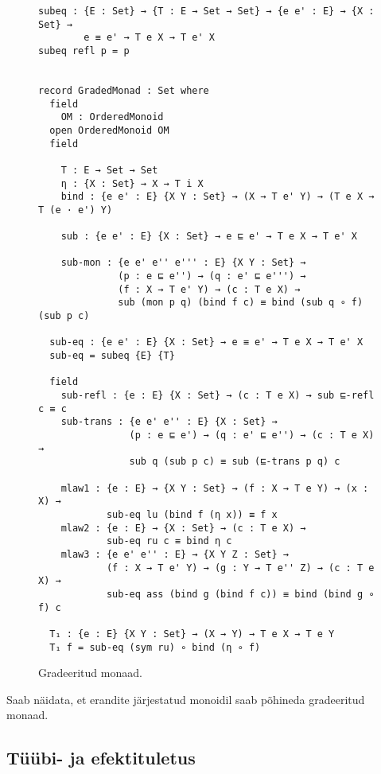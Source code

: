 \documentclass[a4paper,12pt]{article}
\begin{document}
\begin{figure}
  \begin{BVerbatim}
subeq : {E : Set} → {T : E → Set → Set} → {e e' : E} → {X : Set} →
        e ≡ e' → T e X → T e' X
subeq refl p = p


record GradedMonad : Set where
  field
    OM : OrderedMonoid
  open OrderedMonoid OM
  field

    T : E → Set → Set
    η : {X : Set} → X → T i X
    bind : {e e' : E} {X Y : Set} → (X → T e' Y) → (T e X → T (e · e') Y)

    sub : {e e' : E} {X : Set} → e ⊑ e' → T e X → T e' X

    sub-mon : {e e' e'' e''' : E} {X Y : Set} →
              (p : e ⊑ e'') → (q : e' ⊑ e''') → 
              (f : X → T e' Y) → (c : T e X) → 
              sub (mon p q) (bind f c) ≡ bind (sub q ∘ f) (sub p c) 

  sub-eq : {e e' : E} {X : Set} → e ≡ e' → T e X → T e' X
  sub-eq = subeq {E} {T}
 
  field
    sub-refl : {e : E} {X : Set} → (c : T e X) → sub ⊑-refl c ≡ c
    sub-trans : {e e' e'' : E} {X : Set} →
                (p : e ⊑ e') → (q : e' ⊑ e'') → (c : T e X) → 
                sub q (sub p c) ≡ sub (⊑-trans p q) c   

    mlaw1 : {e : E} → {X Y : Set} → (f : X → T e Y) → (x : X) →
            sub-eq lu (bind f (η x)) ≡ f x
    mlaw2 : {e : E} → {X : Set} → (c : T e X) →
            sub-eq ru c ≡ bind η c
    mlaw3 : {e e' e'' : E} → {X Y Z : Set} →
            (f : X → T e' Y) → (g : Y → T e'' Z) → (c : T e X) → 
            sub-eq ass (bind g (bind f c)) ≡ bind (bind g ∘ f) c 

  T₁ : {e : E} {X Y : Set} → (X → Y) → T e X → T e Y
  T₁ f = sub-eq (sym ru) ∘ bind (η ∘ f)
  \end{BVerbatim}
  \caption{Gradeeritud monaad.}
  \label{fig:graded-monad}
\end{figure}

Saab näidata, et erandite järjestatud monoidil saab põhineda gradeeritud monaad.

\subsection{Tüübi- ja efektituletus}\label{ssec:exc.inference}
\end{document}
